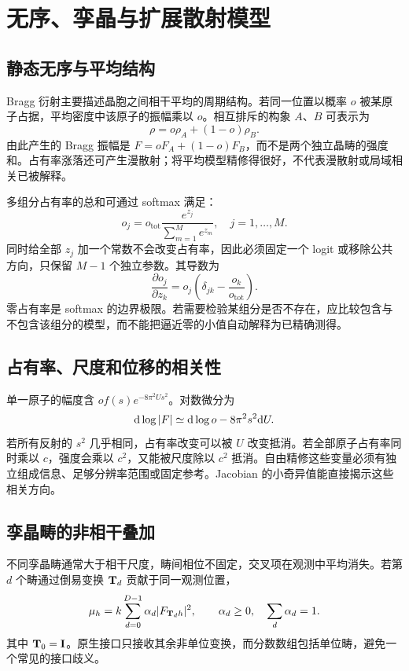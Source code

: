\chapter{无序、孪晶与扩展散射模型}
\section{静态无序与平均结构}
Bragg 衍射主要描述晶胞之间相干平均的周期结构。若同一位置以概率 $o$ 被某原子占据，平均密度中该原子的振幅乘以 $o$。相互排斥的构象 $A$、$B$ 可表示为
\begin{equation}
\rho=o\rho_A+(1-o)\rho_B.
\end{equation}
由此产生的 Bragg 振幅是 $F=oF_A+(1-o)F_B$，而不是两个独立晶畴的强度和。占有率涨落还可产生漫散射；将平均模型精修得很好，不代表漫散射或局域相关已被解释。

多组分占有率的总和可通过 softmax 满足：
\begin{equation}
o_j=o_{\mathrm{tot}}\frac{e^{z_j}}{\sum_{m=1}^{M}e^{z_m}},\quad j=1,\ldots,M.
\end{equation}
同时给全部 $z_j$ 加一个常数不会改变占有率，因此必须固定一个 logit 或移除公共方向，只保留 $M-1$ 个独立参数。其导数为
\begin{equation}
\frac{\partial o_j}{\partial z_k}
=o_j\left(\delta_{jk}-\frac{o_k}{o_{\mathrm{tot}}}\right).
\end{equation}
零占有率是 softmax 的边界极限。若需要检验某组分是否不存在，应比较包含与不包含该组分的模型，而不能把逼近零的小值自动解释为已精确测得。

\section{占有率、尺度和位移的相关性}
单一原子的幅度含 $o f(s)e^{-8\pi^2Us^2}$。对数微分为
\begin{equation}
\mathrm{d}\log|F|\simeq\mathrm{d}\log o-8\pi^2s^2\mathrm{d} U.
\end{equation}
若所有反射的 $s^2$ 几乎相同，占有率改变可以被 $U$ 改变抵消。若全部原子占有率同时乘以 $c$，强度会乘以 $c^2$，又能被尺度除以 $c^2$ 抵消。自由精修这些变量必须有独立组成信息、足够分辨率范围或固定参考。Jacobian 的小奇异值能直接揭示这些相关方向。

\section{孪晶畴的非相干叠加}
不同孪晶畴通常大于相干尺度，畴间相位不固定，交叉项在观测中平均消失。若第 $d$ 个畴通过倒易变换 $\mathbf{T}_d$ 贡献于同一观测位置，
\begin{equation}
\mu_h=k\sum_{d=0}^{D-1}\alpha_d|F_{\mathbf{T}_dh}|^2,
\qquad \alpha_d\ge0,\quad\sum_d\alpha_d=1.
\label{eq:twin}
\end{equation}
其中 $\mathbf{T}_0=\mathbf{I}$。原生接口只接收其余非单位变换，而分数数组包括单位畴，避免一个常见的接口歧义。

